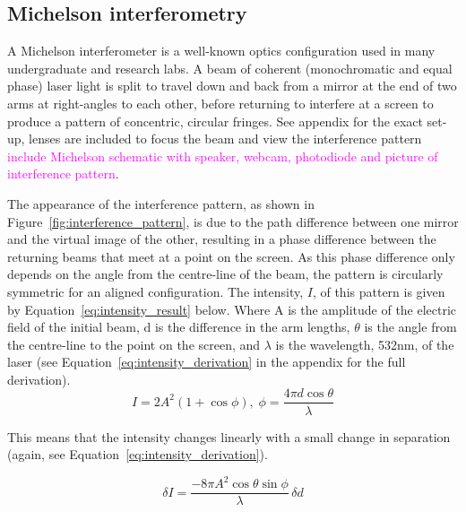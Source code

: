\documentclass[prb,preprint]{revtex4-1}
\newcommand{\jam}{\textcolor{magenta}}
\begin{document}
\subsection{Michelson interferometry}

A Michelson interferometer is a well-known optics configuration used in many undergraduate and research labs. A beam of coherent (monochromatic and equal phase) laser light is split to travel down and back from a mirror at the end of two arms at right-angles to each other, before returning to interfere at a screen to produce a pattern of concentric, circular fringes. See appendix for the exact set-up, lenses are included to focus the beam and view the interference pattern \jam{include Michelson schematic with speaker, webcam, photodiode and picture of interference pattern}.


The appearance of the interference pattern, as shown in Figure~\ref{fig:interference_pattern}, is due to the path difference between one mirror and the virtual image of the other, resulting in a phase difference between the returning beams that meet at a point on the screen. As this phase difference only depends on the angle from the centre-line of the beam, the pattern is circularly symmetric for an aligned configuration. The intensity, $I$, of this pattern is given by Equation~\ref{eq:intensity_result} below. Where A is the amplitude of the electric field of the initial beam, d is the difference in the arm lengths, $\theta$ is the angle from the centre-line to the point on the screen, and $\lambda$ is the wavelength, 532nm, of the laser (see Equation~\ref{eq:intensity_derivation} in the appendix for the full derivation).
\begin{equation}
\label{eq:intensity_result}
I = 2 A^2 (1+\cos{\phi}), \; \phi = \frac{4 \pi d \cos{\theta}}{\lambda}
\end{equation}

This means that the intensity changes linearly with a small change in separation (again, see Equation~\ref{eq:intensity_derivation}).

\begin{equation}
	\delta I = \frac{- 8 \pi A^2 \cos{\theta} \sin{\phi}}{\lambda}\, \delta d
\end{equation}
\end{document}
